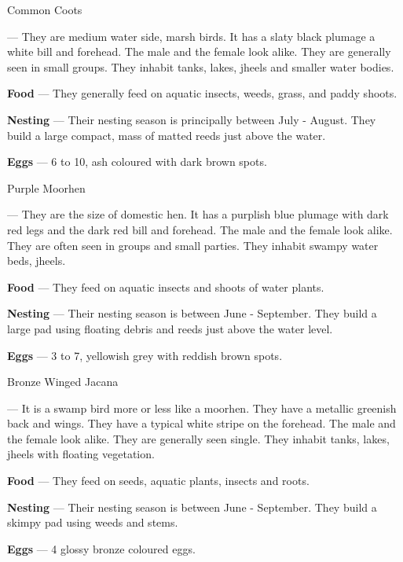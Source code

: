 \begin{bird}{Common Coots}

 --- They are medium water side, marsh birds. It has a slaty black plumage a white bill and forehead. The male and the female look alike. They are generally seen in small groups. They inhabit tanks, lakes, jheels and smaller water bodies. 

{\large\bf Food} --- They generally feed on aquatic insects, weeds, grass, and paddy shoots. 

{\large\bf Nesting} --- Their nesting season is principally between July - August. They build a large compact, mass of matted reeds just above the water.

{\bf Eggs} --- 6 to 10, ash coloured with dark brown spots.
\end{bird}

\begin{bird}{Purple Moorhen}

 --- They are the size of domestic hen. It has a purplish blue plumage with dark red legs and the dark red bill and forehead. The male and the female look alike. They are often seen in groups and small parties. They inhabit swampy water beds, jheels.

{\large\bf Food} --- They feed on aquatic insects and shoots of water plants. 

{\large\bf Nesting} --- Their nesting season is between June - September. They build a large pad using floating debris and reeds just above the water level. 

{\large\bf Eggs} --- 3 to 7, yellowish grey with reddish brown spots.
\end{bird}

\begin{bird}{Bronze Winged Jacana}

 --- It is a swamp bird more or less like a moorhen. They have a metallic greenish back and wings. They have a typical white stripe on the forehead. The male and the female look alike. They are generally seen single. They inhabit tanks, lakes, jheels with floating vegetation. 

{\large\bf Food} --- They feed on seeds, aquatic plants, insects and roots.

{\large\bf Nesting} --- Their nesting season is between June - September. They build a skimpy pad using weeds and stems.

{\large\bf Eggs} --- 4 glossy bronze coloured eggs.
\end{bird}


